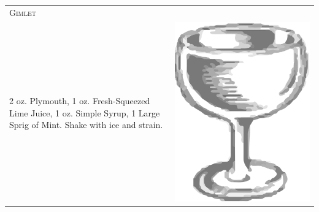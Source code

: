 \documentclass{article}
\begin{document}
\begin{tabular}{p{2in} p{0.5in}}
	\multicolumn{2}{p{3in}}{\centering\Huge\textsc{Gimlet}} \\ 
	   \vspace{-0.1in}2 oz. Plymouth, 1 oz. Fresh-Squeezed Lime Juice, 1 oz. Simple Syrup, 1 Large Sprig of Mint. Shake with ice and strain. &
	   \vspace{-0.1in} \includegraphics{coupe.png}
\end{tabular}
\end{document}
